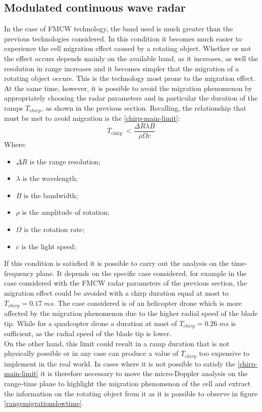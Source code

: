 \subsection{Modulated continuous wave radar}

In the case of FMCW technology, the band used is much greater than the previous technologies considered. In this condition it becomes much easier to experience the cell migration effect caused by a rotating object. Whether or not the effect occurs depends mainly on the available band, as it increases, as well the resolution in range increases and it becomes simpler that the migration of a rotating object occurs. This is the technology most prone to the migration effect. At the same time, however, it is possible to avoid the migration phenomenon by appropriately choosing the radar parameters and in particular the duration of the ramps $T_{chirp}$, as shown in the previous section. Recalling, the relationship that must be met to avoid migration is the \ref{chirp-main-limit}:
\begin{equation}
T_{\text {chirp }}<\frac{\Delta R \lambda B}{\rho \Omega c}
\end{equation}
Where:
\begin{itemize}
    \item $\Delta R$ is the range resolution;
    
    \item \textbf{$\lambda$} is the wavelength;
    \item \textbf{$B$} is the bandwidth;
    \item \textbf{$\rho$} is the amplitude of rotation;
    \item \textbf{$\Omega$} is the rotation rate;
    \item \textbf{$c$} is the light speed;
\end{itemize}
If this condition is satisfied it is possible to carry out the analysis on the time-frequency plane. It depends on the specific case considered, for example in the case considered with the FMCW radar parameters of the previous section, the migration effect could be avoided with a chirp duration equal at most to $T_{chirp} = 0.17\;ms $. The case considered is of an helicopter drone which is more affected by the migration phenomenon due to the higher radial speed of the blade tip. While for a quadcopter drone a duration at most of $T_{chirp} = 0.26\;ms $ is sufficient, as the radial speed of the blade tip is lower.\\
On the other hand, this limit could result in a ramp duration that is not physically possible or in any case can produce a value of $T_{chirp}$ too expensive to implement in the real world. In cases where it is not possible to satisfy the \ref{chirp-main-limit} it is therefore necessary to move the micro-Doppler analysis on the range-time plane to highlight the migration phenomenon of the cell and extract the information on the rotating object from it as it is possible to observe in figure \ref{rangemigrationslowtime}.
